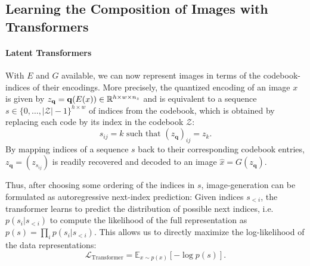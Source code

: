 \documentclass[final]{cvpr}
\newcommand{\RR}{\mathbb{R}}
\newcommand{\codebook}{\mathcal{Z}}
\newcommand{\decoder}{G}
\newcommand{\encoder}{E}
\newcommand{\quantize}{\mathbf{q}}
\newcommand{\quantizedcode}{z_{\mathbf{q}}}
\begin{document}
\subsection{Learning the Composition of Images with Transformers}
\label{sec:trafo}
%
\paragraph{Latent Transformers} With $\encoder$ and $\decoder$ available, we can now represent images in terms of the codebook-indices of
their encodings. More precisely, the quantized encoding of an image $x$ is given by
$\quantizedcode = \quantize(\encoder(x)) \in \RR^{h \times w \times
\codebookdim}$ and is equivalent to
%
%
a sequence $s \in \{0, \dots, \vert \codebook \vert - 1 \}^{h \times w}$ of indices from the codebook,
which is obtained
by replacing each code by its index in the codebook $\codebook$:
\begin{equation}
%
  s_{ij} = k \text{ such that } \left( \quantizedcode \right)_{ij} = z_k.
\label{eq:indexmap}
\end{equation}
By mapping indices of a sequence $s$ back to their corresponding codebook entries,
$\quantizedcode = \left( z_{s_{ij}} \right)$ is readily recovered and decoded to an image $\hat{x} =
\decoder(\quantizedcode)$.
%
%

Thus, after choosing some ordering of the indices in $s$, image-generation can be formulated as
autoregressive next-index prediction: Given indices
$s_{<i}$, the transformer learns to predict the distribution of possible next
indices, i.e. $p(s_i \vert s_{<i})$ to compute the likelihood of the full representation as
%
$p(s)=\prod_i p(s_i \vert s_{<i})$.
%
This allows us to directly maximize the log-likelihood of the data
representations:
\begin{equation}
  \mathcal{L}_{\text{Transformer}} = \mathbb{E}_{x \sim p(x)} \left[ -\log p(s) \right].
\end{equation}
\end{document}

